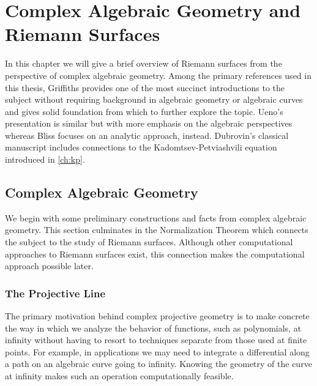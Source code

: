\chapter{Complex Algebraic Geometry and Riemann Surfaces}\label{ch:background}

In this chapter we will give a brief overview of Riemann surfaces from the
perspective of complex algebraic geometry. Among the primary references used in
this thesis, Griffiths \cite{Giffiths89} provides one of the most succinct
introductions to the subject without requiring background in algebraic geometry
or algebraic curves and gives solid foundation from which to further explore the
topic. Ueno's \cite{Ueno97} presentation is similar but with more emphasis on
the algebraic perspectives whereas Bliss \cite{bliss} focuses on an analytic
approach, instead. Dubrovin's \cite{Dubrovin81} classical manuscript includes
connections to the Kadomtsev-Petviashvili equation introduced in
\autoref{ch:kp}.

\section{Complex Algebraic Geometry}\label{sec:background-complex-algebraic-geometry}

We begin with some preliminary constructions and facts from complex algebraic
geometry. This section culminates in the Normalization Theorem which connects
the subject to the study of Riemann surfaces. Although other computational
approaches to Riemann surfaces exist, this connection makes the computational
approach possible later.

\subsection{The Projective Line}

The primary motivation behind complex projective geometry is to make concrete
the way in which we analyze the behavior of functions, such as polynomials, at
infinity without having to resort to techniques separate from those used at
finite points. For example, in applications we may need to integrate a
differential along a path on an algebraic curve going to infinity. Knowing the
geometry of the curve at infinity makes such an operation computationally
feasible.

